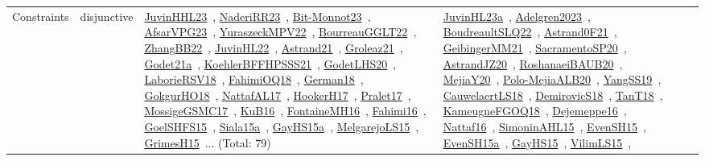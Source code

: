 {\begin{longtable}{lp{3cm}>{\raggedright\arraybackslash}p{6cm}>{\raggedright\arraybackslash}p{6cm}>{\raggedright\arraybackslash}p{8cm}}
Constraints & disjunctive & \href{works/JuvinHHL23.pdf}{JuvinHHL23}~\cite{JuvinHHL23}, \href{works/NaderiRR23.pdf}{NaderiRR23}~\cite{NaderiRR23}, \href{works/Bit-Monnot23.pdf}{Bit-Monnot23}~\cite{Bit-Monnot23}, \href{works/AfsarVPG23.pdf}{AfsarVPG23}~\cite{AfsarVPG23}, \href{works/YuraszeckMPV22.pdf}{YuraszeckMPV22}~\cite{YuraszeckMPV22}, \href{works/BourreauGGLT22.pdf}{BourreauGGLT22}~\cite{BourreauGGLT22}, \href{works/ZhangBB22.pdf}{ZhangBB22}~\cite{ZhangBB22}, \href{works/JuvinHL22.pdf}{JuvinHL22}~\cite{JuvinHL22}, \href{works/Astrand21.pdf}{Astrand21}~\cite{Astrand21}, \href{works/Groleaz21.pdf}{Groleaz21}~\cite{Groleaz21}, \href{works/Godet21a.pdf}{Godet21a}~\cite{Godet21a}, \href{works/KoehlerBFFHPSSS21.pdf}{KoehlerBFFHPSSS21}~\cite{KoehlerBFFHPSSS21}, \href{works/GodetLHS20.pdf}{GodetLHS20}~\cite{GodetLHS20}, \href{works/LaborieRSV18.pdf}{LaborieRSV18}~\cite{LaborieRSV18}, \href{works/FahimiOQ18.pdf}{FahimiOQ18}~\cite{FahimiOQ18}, \href{works/German18.pdf}{German18}~\cite{German18}, \href{works/GokgurHO18.pdf}{GokgurHO18}~\cite{GokgurHO18}, \href{works/NattafAL17.pdf}{NattafAL17}~\cite{NattafAL17}, \href{works/HookerH17.pdf}{HookerH17}~\cite{HookerH17}, \href{works/Pralet17.pdf}{Pralet17}~\cite{Pralet17}, \href{works/MossigeGSMC17.pdf}{MossigeGSMC17}~\cite{MossigeGSMC17}, \href{works/KuB16.pdf}{KuB16}~\cite{KuB16}, \href{works/FontaineMH16.pdf}{FontaineMH16}~\cite{FontaineMH16}, \href{works/Fahimi16.pdf}{Fahimi16}~\cite{Fahimi16}, \href{works/GoelSHFS15.pdf}{GoelSHFS15}~\cite{GoelSHFS15}, \href{works/Siala15a.pdf}{Siala15a}~\cite{Siala15a}, \href{works/GayHS15a.pdf}{GayHS15a}~\cite{GayHS15a}, \href{works/MelgarejoLS15.pdf}{MelgarejoLS15}~\cite{MelgarejoLS15}, \href{works/GrimesH15.pdf}{GrimesH15}~\cite{GrimesH15}... (Total: 79) & \href{works/JuvinHL23a.pdf}{JuvinHL23a}~\cite{JuvinHL23a}, \href{works/Adelgren2023.pdf}{Adelgren2023}~\cite{Adelgren2023}, \href{works/BoudreaultSLQ22.pdf}{BoudreaultSLQ22}~\cite{BoudreaultSLQ22}, \href{works/Astrand0F21.pdf}{Astrand0F21}~\cite{Astrand0F21}, \href{works/GeibingerMM21.pdf}{GeibingerMM21}~\cite{GeibingerMM21}, \href{works/SacramentoSP20.pdf}{SacramentoSP20}~\cite{SacramentoSP20}, \href{works/AstrandJZ20.pdf}{AstrandJZ20}~\cite{AstrandJZ20}, \href{works/RoshanaeiBAUB20.pdf}{RoshanaeiBAUB20}~\cite{RoshanaeiBAUB20}, \href{works/MejiaY20.pdf}{MejiaY20}~\cite{MejiaY20}, \href{works/Polo-MejiaALB20.pdf}{Polo-MejiaALB20}~\cite{Polo-MejiaALB20}, \href{works/YangSS19.pdf}{YangSS19}~\cite{YangSS19}, \href{works/CauwelaertLS18.pdf}{CauwelaertLS18}~\cite{CauwelaertLS18}, \href{works/DemirovicS18.pdf}{DemirovicS18}~\cite{DemirovicS18}, \href{works/TanT18.pdf}{TanT18}~\cite{TanT18}, \href{works/KameugneFGOQ18.pdf}{KameugneFGOQ18}~\cite{KameugneFGOQ18}, \href{works/Dejemeppe16.pdf}{Dejemeppe16}~\cite{Dejemeppe16}, \href{works/Nattaf16.pdf}{Nattaf16}~\cite{Nattaf16}, \href{works/SimoninAHL15.pdf}{SimoninAHL15}~\cite{SimoninAHL15}, \href{works/EvenSH15.pdf}{EvenSH15}~\cite{EvenSH15}, \href{works/EvenSH15a.pdf}{EvenSH15a}~\cite{EvenSH15a}, \href{works/GayHS15.pdf}{GayHS15}~\cite{GayHS15}, \href{works/VilimLS15.pdf}{VilimLS15}~\cite{VilimLS15}, 
\end{longtable}}
